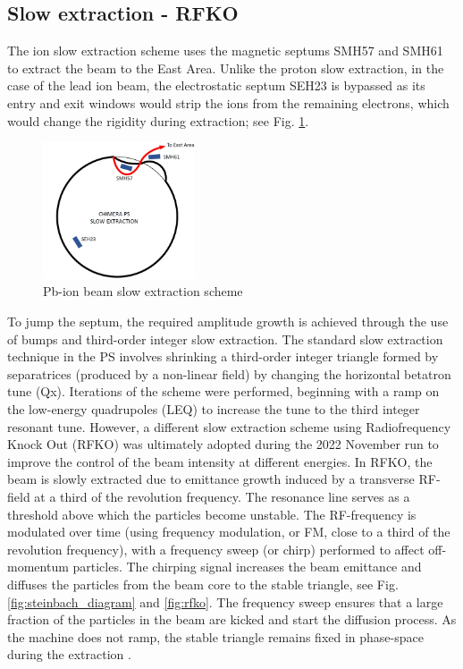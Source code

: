 \subsection{Slow extraction - RFKO}

The ion slow extraction scheme uses the magnetic septums SMH57 and SMH61 to extract the beam to the East Area. Unlike the proton slow extraction, in the case of the lead ion beam, the electrostatic septum SEH23 is bypassed as its entry and exit windows would strip the ions from the remaining electrons, which would change the rigidity during extraction; see Fig. \ref{fig:sx}.

\begin{figure}[!htb]
\centering
\includegraphics[width=0.4\textwidth]{images/BEAM_INTENSITY/SX_CHIMERA.jpg}
\caption{Pb-ion beam slow extraction scheme}
\label{fig:sx}
\end{figure}

To jump the septum, the required amplitude growth is achieved through the use of bumps and third-order integer slow extraction. The standard slow extraction technique in the PS involves shrinking a third-order integer triangle formed by separatrices (produced by a non-linear field) by changing the horizontal betatron tune (Qx). Iterations of the scheme were performed, beginning with a ramp on the low-energy quadrupoles (LEQ) to increase the tune to the third integer resonant tune. However, a different slow extraction scheme using Radiofrequency Knock Out (RFKO) was ultimately adopted during the 2022 November run to improve the control of the beam intensity at different energies. In RFKO, the beam is slowly extracted due to emittance growth induced by a transverse RF-field at a third of the revolution frequency. The resonance line serves as a threshold above which the particles become unstable. The RF-frequency is modulated over time (using frequency modulation, or FM, close to a third of the revolution frequency), with a frequency sweep (or chirp) performed to affect off-momentum particles. The chirping signal increases the beam emittance and diffuses the particles from the beam core to the stable triangle, see Fig. \ref{fig:steinbach_diagram} and \ref{fig:rfko}. The frequency sweep ensures that a large fraction of the particles in the beam are kicked and start the diffusion process. As the machine does not ramp, the stable triangle remains fixed in phase-space during the extraction \cite{noda_slow_1996, badano_proton-ion_1999, dulla_radio_2019}.
\\

